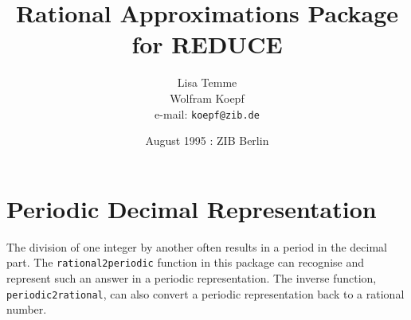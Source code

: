 \title{{\bf Rational Approximations Package for REDUCE}}
\author{Lisa Temme\\Wolfram Koepf\\ e-mail: {\tt koepf@zib.de}}
\date{August 1995 : ZIB Berlin}

\maketitle

\section{Periodic Decimal Representation}

The division of one integer by another often results in
a period in the decimal part. The {\tt rational2periodic}
function in this package can recognise and represent
such an answer in a periodic representation. The inverse
function, {\tt periodic2rational}, can also convert a
periodic representation back to a rational number.\\


